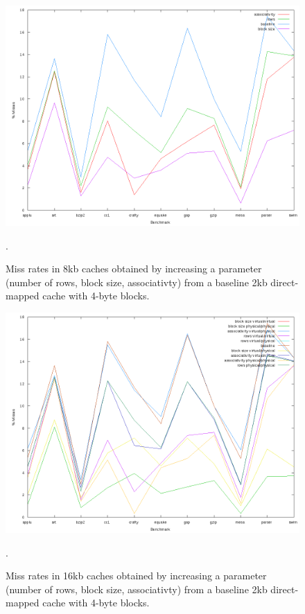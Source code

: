 \begin{figure}[htb]
  \includegraphics[width=6.8in]{6.823/lab2/figs/ccc_8k.png}
  \caption{Miss rates in 8kb caches obtained by increasing a parameter
  (number of rows, block size, associativty) from a baseline 2kb direct-mapped
  cache with 4-byte blocks.} \label{q1:8k}.
\end{figure}

\begin{figure}[htb]
  \includegraphics[width=6.8in]{6.823/lab2/figs/ccc_16k.png}
  \caption{Miss rates in 16kb caches obtained by increasing a parameter
  (number of rows, block size, associativty) from a baseline 2kb direct-mapped
  cache with 4-byte blocks.} \label{q1:16k}.
\end{figure}

